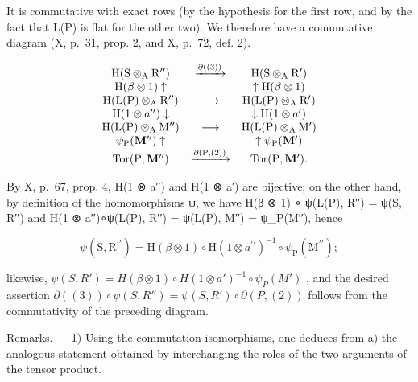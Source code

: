 It is commutative with exact rows (by the hypothesis for the first row, and by the fact that L(P) is flat for the other two). We therefore have a commutative diagram (X, p.~31, prop. 2, and X, p.~72, def. 2).

\[
\begin{array}{c c c} \mathrm{H} (\mathrm{S} \otimes_ {\mathrm{A}} \mathrm{R} ^ {\prime \prime}) & \xrightarrow {\partial ((3))} & \mathrm{H} (\mathrm{S} \otimes_ {\mathrm{A}} \mathrm{R} ^ {\prime}) \\ \mathrm{H} (\beta \otimes 1) \uparrow & & \uparrow \mathrm{H} (\beta \otimes 1) \\ \mathrm{H} (\mathrm{L} (\mathrm{P}) \otimes_ {\mathrm{A}} \mathrm{R} ^ {\prime \prime}) & \longrightarrow & \mathrm{H} (\mathrm{L} (\mathrm{P}) \otimes_ {\mathrm{A}} \mathrm{R} ^ {\prime}) \\ \mathrm{H} (1 \otimes a ^ {\prime \prime}) \downarrow & & \downarrow \mathrm{H} (1 \otimes a ^ {\prime}) \\ \mathrm{H} (\mathrm{L} (\mathrm{P}) \otimes_ {\mathrm{A}} \mathrm{M} ^ {\prime \prime}) & \longrightarrow & \mathrm{H} (\mathrm{L} (\mathrm{P}) \otimes_ {\mathrm{A}} \mathrm{M} ^ {\prime}) \\ \psi_ {\mathrm{P}} (\mathbf {M} ^ {\prime \prime}) \uparrow & & \uparrow \psi_ {\mathrm{P}} (\mathbf {M} ^ {\prime}) \\ \operatorname{Tor} (\mathrm{P}, \mathbf {M} ^ {\prime \prime}) & \xrightarrow {\partial (\mathrm{P} , (2))} & \operatorname{Tor} (\mathrm{P}, \mathbf {M} ^ {\prime}). \end{array}
\]

By X, p.~67, prop. 4, H(1 ⊗ a′′) and H(1 ⊗ a′) are bijective; on the other hand, by definition of the homomorphisms ψ, we have H(β ⊗ 1) ∘ ψ(L(P), R′′) = ψ(S, R′′) and H(1 ⊗ a′′)∘ψ(L(P), R′′) = ψ(L(P), M′′) = ψ\_P(M′′), hence

\[
\psi (\mathrm{S}, \mathrm{R} ^ {\prime \prime}) = \mathrm{H} (\beta \otimes 1) \circ \mathrm{H} (1 \otimes a ^ {\prime \prime}) ^ {- 1} \circ \psi_ {\mathrm{P}} (\mathrm{M} ^ {\prime \prime});
\]

likewise, \(\psi(S, R') = H(\beta \otimes 1) \circ H(1 \otimes a')^{-1} \circ \psi_P(M')\) , and the desired assertion \(\partial((3)) \circ \psi(S, R'') = \psi(S, R') \circ \partial(P, (2))\) follows from the commutativity of the preceding diagram.

Remarks. --- 1) Using the commutation isomorphisms, one deduces from a) the analogous statement obtained by interchanging the roles of the two arguments of the tensor product.

